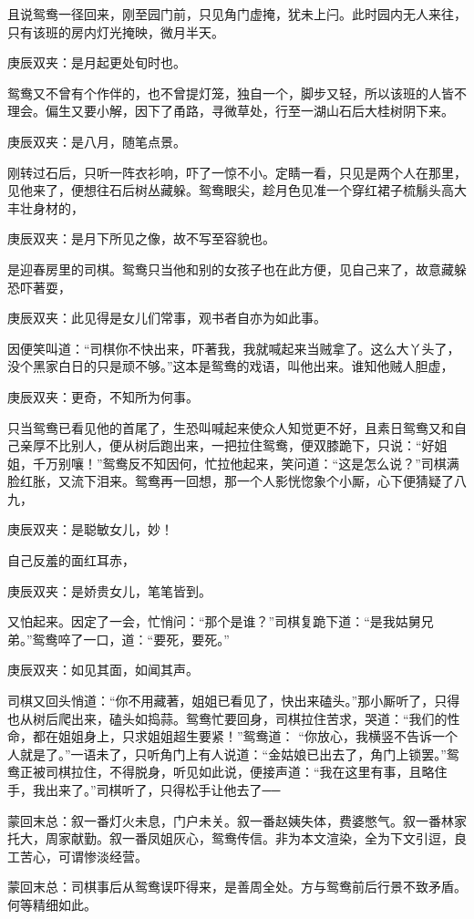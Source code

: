 \begin{parag}
    且说鸳鸯一径回来，刚至园门前，只见角门虚掩，犹未上闩。此时园内无人来往，只有该班的房内灯光掩映，微月半天。\begin{note}庚辰双夹：是月起更处旬时也。\end{note}鸳鸯又不曾有个作伴的，也不曾提灯笼，独自一个，脚步又轻，所以该班的人皆不理会。偏生又要小解，因下了甬路，寻微草处，行至一湖山石后大桂树阴下来。\begin{note}庚辰双夹：是八月，随笔点景。\end{note}刚转过石后，只听一阵衣衫响，吓了一惊不小。定睛一看，只见是两个人在那里，见他来了，便想往石后树丛藏躲。鸳鸯眼尖，趁月色见准一个穿红裙子梳鬅头高大丰壮身材的，\begin{note}庚辰双夹：是月下所见之像，故不写至容貌也。\end{note}是迎春房里的司棋。鸳鸯只当他和别的女孩子也在此方便，见自己来了，故意藏躲恐吓著耍，\begin{note}庚辰双夹：此见得是女儿们常事，观书者自亦为如此事。\end{note}因便笑叫道：“司棋你不快出来，吓著我，我就喊起来当贼拿了。这么大丫头了，没个黑家白日的只是顽不够。”这本是鸳鸯的戏语，叫他出来。谁知他贼人胆虚，\begin{note}庚辰双夹：更奇，不知所为何事。\end{note}只当鸳鸯已看见他的首尾了，生恐叫喊起来使众人知觉更不好，且素日鸳鸯又和自己亲厚不比别人，便从树后跑出来，一把拉住鸳鸯，便双膝跪下，只说：“好姐姐，千万别嚷！”鸳鸯反不知因何，忙拉他起来，笑问道：“这是怎么说？”司棋满脸红胀，又流下泪来。鸳鸯再一回想，那一个人影恍惚象个小厮，心下便猜疑了八九，\begin{note}庚辰双夹：是聪敏女儿，妙！\end{note}自己反羞的面红耳赤，\begin{note}庚辰双夹：是娇贵女儿，笔笔皆到。\end{note}又怕起来。因定了一会，忙悄问：“那个是谁？”司棋复跪下道：“是我姑舅兄弟。”鸳鸯啐了一口，道：“要死，要死。”\begin{note}庚辰双夹：如见其面，如闻其声。\end{note}司棋又回头悄道：“你不用藏著，姐姐已看见了，快出来磕头。”那小厮听了，只得也从树后爬出来，磕头如捣蒜。鸳鸯忙要回身，司棋拉住苦求，哭道：“我们的性命，都在姐姐身上，只求姐姐超生要紧！”鸳鸯道： “你放心，我横竖不告诉一个人就是了。”一语未了，只听角门上有人说道：“金姑娘已出去了，角门上锁罢。”鸳鸯正被司棋拉住，不得脱身，听见如此说，便接声道：“我在这里有事，且略住手，我出来了。”司棋听了，只得松手让他去了──
\end{parag}


\begin{parag}
    \begin{note}蒙回末总：叙一番灯火未息，门户未关。叙一番赵姨失体，费婆憋气。叙一番林家托大，周家献勤。叙一番凤姐灰心，鸳鸯传信。非为本文渲染，全为下文引逗，良工苦心，可谓惨淡经营。\end{note}
\end{parag}


\begin{parag}
    \begin{note}蒙回末总：司棋事后从鸳鸯误吓得来，是善周全处。方与鸳鸯前后行景不致矛盾。何等精细如此。\end{note}
\end{parag}
